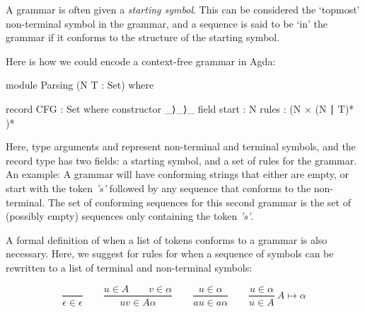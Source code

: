 	A grammar is often given a \emph{starting symbol}. This can be considered
	the `topmost' non-terminal symbol in the grammar, and a sequence is said to
	be `in' the grammar if it conforms to the structure of the starting symbol.

	Here is how we could encode a context-free grammar in Agda:

	\begin{code}
		module Parsing (N T : Set) where

		record CFG : Set where
		  constructor _⟩_⟩_
		  field
		start : N
		rules : (N × (N ∣ T)* )*
	\end{code}

	Here, type arguments  and  represent non-terminal and
	terminal symbols, and the record type has two fields: a starting symbol,
	and a set of rules for the grammar.  An example: A grammar   will have conforming strings that either are empty, or start
	with the token \emph{'s'} 
	 followed by any sequence that conforms to the
	 non-terminal. The set of conforming sequences for this second
	grammar is the set of (possibly empty) sequences only containing the token
	\emph{'s'}.

	A formal definition of when a list of tokens conforms to a grammar is also
	necessary. Here, we suggest for rules for when a sequence of symbols can be
	rewritten to a list of terminal and non-terminal symbols:

	\[
	\frac{\ }{\epsilon\in\epsilon} \qquad
	\frac{u\in A \qquad v\in\alpha}{uv\in A\alpha} \qquad
	\frac{u\in\alpha}{au\in a\alpha} \qquad
	\frac{u\in\alpha}{u\in A}\ A \mapsto \alpha
	\]


